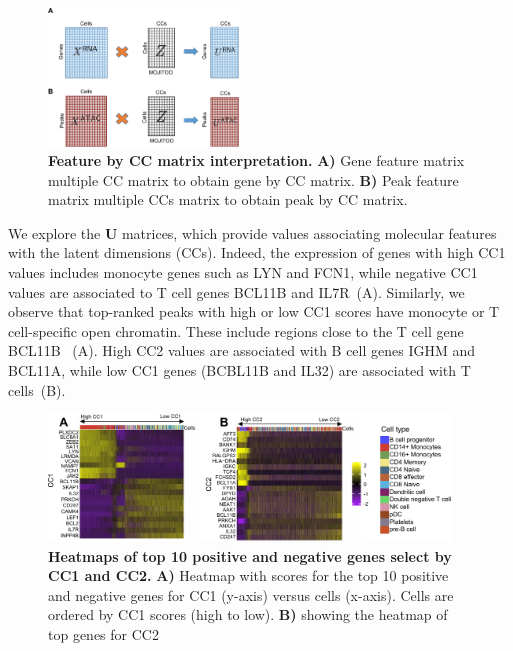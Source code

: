 \begin{figure}[!h]
    \centering
    \includegraphics[width=0.45\textwidth]{Zfeature/fig}
    \vspace{0.1cm}
    \caption[Feature by CC matrix interpretation.]{\textbf{Feature by CC matrix interpretation.} \textbf{A)} Gene feature matrix multiple CC matrix to obtain gene by CC matrix. \textbf{B)} Peak feature matrix multiple CCs matrix to obtain peak by CC matrix.}
    \label{fig:Zfeature}
\end{figure}

We explore the $\textbf{U}$ matrices, which provide values associating molecular features with the latent dimensions (CCs). Indeed, the expression of genes with high CC1 values includes monocyte genes such as LYN and FCN1, while negative CC1 values are associated to T cell genes BCL11B and IL7R~(A). Similarly, we observe that top-ranked peaks with high or low CC1 scores have monocyte or T cell-specific open chromatin. These include regions close to the T cell gene BCL11B ~(A). High CC2 values are associated with B cell genes IGHM and BCL11A, while low CC1 genes (BCBL11B and IL32) are associated with T cells~(B).

\begin{figure}[!h]
	\centering
	\includegraphics[width=0.95\textwidth]{CC_Genes/fig}
	\vspace{0.1cm}
	\caption[Heatmaps of top 10 positive and negative genes select by CC1 and CC2.]{\textbf{Heatmaps of top 10 positive and negative genes select by CC1 and CC2.} \textbf{A)} Heatmap with scores for the top 10 positive and negative genes for CC1 (y-axis) versus cells (x-axis). Cells are ordered by CC1 scores (high to low). \textbf{B)} showing the heatmap of top genes for CC2}
	\label{fig:CC_Genes}
\end{figure}

